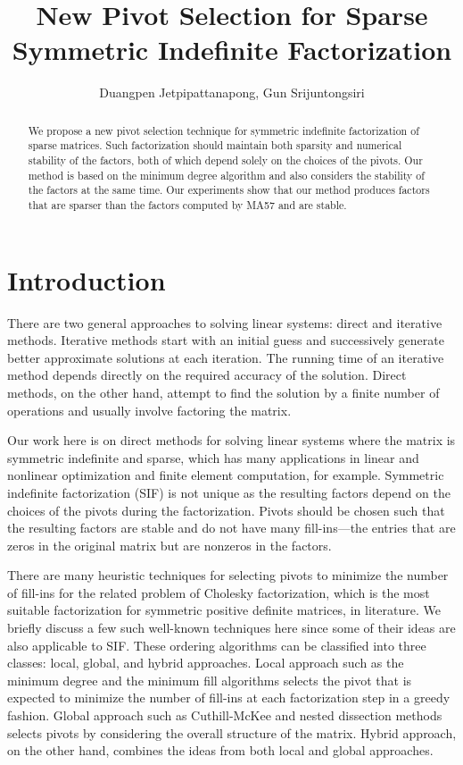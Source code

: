 \documentclass{article}
\title{New Pivot Selection for Sparse Symmetric Indefinite Factorization}
\author{Duangpen Jetpipattanapong, Gun Srijuntongsiri}
\begin{document}
\maketitle


\begin{abstract} 
We propose a new pivot selection technique for symmetric indefinite factorization of sparse matrices.
Such factorization should maintain both sparsity and numerical stability of the factors, both of which depend solely on the choices of the pivots.
Our method is based on the minimum degree algorithm and also considers the stability of the factors at the same time.
Our experiments show that our method produces factors that are sparser than the factors computed by MA57 \cite{MA57} and are stable.
\end{abstract}

\section{Introduction}

There are two general approaches to solving linear systems: direct and iterative methods.
Iterative methods start with an initial guess and successively generate better approximate solutions at each iteration.
The running time of an iterative method depends directly on the required accuracy of the solution.
Direct methods, on the other hand, attempt to find the solution by a finite number of operations and usually involve factoring the matrix.  

Our work here is on direct methods for solving linear systems where the matrix is symmetric indefinite and sparse, which has many applications in linear and nonlinear optimization and finite element computation, for example.  Symmetric indefinite factorization (SIF) is not unique as the resulting factors depend on the choices of the pivots during the factorization.  Pivots should be chosen such that the resulting factors are stable and do not have many fill-ins---the entries that are zeros in the original matrix but are nonzeros in the factors.  

There are many heuristic techniques for selecting pivots to minimize the number of fill-ins for the related problem of Cholesky factorization, which is the most suitable factorization for symmetric positive definite matrices, in literature.  We briefly discuss a few such well-known techniques here since some of their ideas are also applicable to SIF.
These ordering algorithms can be classified into three classes: local, global, and hybrid approaches.
Local approach such as the minimum degree and the minimum fill algorithms \cite{MD1, MD2, MD3, MDevol, MFNP} selects the pivot that is expected to minimize the number of fill-ins at each factorization step in a greedy fashion.  Global approach such as Cuthill-McKee and nested dissection methods \cite{CM, ND, NDgen} selects pivots by considering the overall structure of the matrix.  Hybrid approach, on the other hand, combines the ideas from both local and global approaches.
\end{document}
